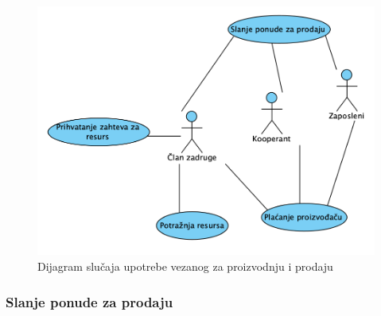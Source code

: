 \documentclass[a4paper, oneside]{article}
\begin{document}

\begin{figure}[h!]
    \centering
    \includegraphics[scale=0.64]{images/dslucup_proizvodnja_prodaja.png}
    \caption{Dijagram slučaja upotrebe vezanog za proizvodnju i prodaju}
    \label{dslucup_proizvodnja_prodaja}
\end{figure}

\clearpage

\subsubsection{Slanje ponude za prodaju}
\end{document}
